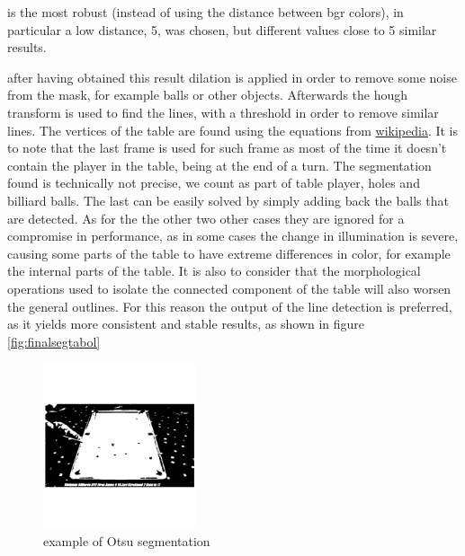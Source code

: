 is the most robust (instead of using the distance between bgr colors), in particular a low distance, 5, was chosen, but different values close to 5 similar results.\par
after having obtained this result dilation is applied in order to remove some noise from the mask,
for example balls or other objects. Afterwards the hough transform is used to find the lines, 
with a threshold in order to remove similar lines.
The vertices of the table are found using the equations from \href{https://en.wikipedia.org/wiki/Line\%E2\%80\%93line\_intersection}{wikipedia}.
It is to note that the last frame is used for such frame as most of the time it doesn't contain the player in the table, being at the end of
a turn.
The segmentation found is technically not precise, we count as part of table player, holes and billiard balls. The last can be easily solved by simply adding back the balls that are detected. 
As for the the other two other cases they are ignored for a compromise in performance, as in some
cases the change in illumination is severe, causing some parts of the table to have extreme 
differences in color, for example the internal parts of the table. It is also to consider that the morphological operations used to isolate the connected component of the table will also worsen
the general outlines. For this reason the output of the line detection is preferred, as it yields
more consistent and stable results, as shown in figure \ref{fig:finalsegtabol}

\begin{figure}[h]
    \centering
    \includegraphics[width=0.4\textwidth]{./imgs/otsu_table.png}
    \caption{example of Otsu segmentation}
    \label{fig:otsutable}
\end{figure}

